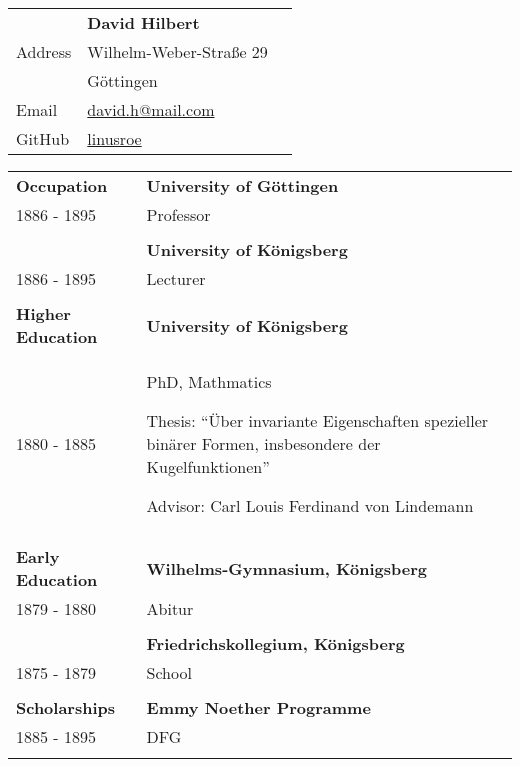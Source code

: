 \documentclass[12pt, a4paper]{article}
\newcommand{\putname}{David Hilbert}
\begin{document}
\begin{longtable}{@{} p{} >{\RaggedRight}p{} >{\RaggedRight}p{}}
  \\
  & \textbf{\putname} 
  & \multirow{4}{*}{\texttt{[image: hilbert]}} \\
  Address
  & Wilhelm-Weber-Straße 29 \\
  & 37075 G\"ottingen \\
  Email
  & \href{mailto:}{david.h@mail.com} \\
  GitHub
  & \href{https://github.com/linusroe}{linusroe} \\
\end{longtable}

\begin{longtable}{@{} p{} >{\RaggedRight}p{}}
  \textcolor{midblue}{\textbf{Occupation}}
  & \textbf{University of Göttingen} \\
  1886 - 1895
  & Professor \\
  & \\

  & \textbf{University of Königsberg} \\
  1886 - 1895
  & Lecturer \\
  & \\


  \textcolor{midblue}{\textbf{Higher Education}}
  & \textbf{University of Königsberg} \\
  1880 - 1885
  & PhD, Mathmatics  

  Thesis: ``Über invariante Eigenschaften spezieller
  binärer Formen, insbesondere der Kugelfunktionen''

  Advisor: Carl Louis Ferdinand von Lindemann \\
  & \\


  \textcolor{midblue}{\textbf{Early Education}}
  & \textbf{Wilhelms-Gymnasium, Königsberg} \\
  1879 - 1880
  & Abitur \\
  & \\

  & \textbf{Friedrichskollegium, Königsberg} \\
  1875 - 1879 
  & School \\
  & \\


  \textcolor{midblue}{\textbf{Scholarships}}
  & \textbf{Emmy Noether Programme} \\
  1885 - 1895
  & DFG \\
  & \\



\end{longtable}
\end{document}
